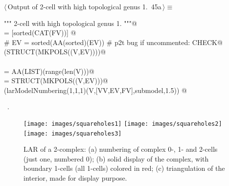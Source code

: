 \documentclass[11pt,oneside]{article}    %
\begin{document}
\begin{flushleft} \small \label{scrap75}
\protect{}$\langle\,$Output of 2-cell with high topological genus 1.\nobreak\ {\footnotesize 45a}$\,\rangle\equiv$
\vspace{-1ex}
\begin{list}{}{} \item
\mbox{}\verb@""" 2-cell with high topological genus 1. """@\\
\mbox{}\verb@FV = [sorted(CAT(FV))] @\\
\mbox{}\verb@# EV = sorted(AA(sorted)(EV))  # p2t bug if uncommented: CHECK@\\
\mbox{}\verb@VIEW(STRUCT(MKPOLS((V,EV))))@\\
\mbox{}\verb@@\\
\mbox{}\verb@VV = AA(LIST)(range(len(V)))@\\
\mbox{}\verb@submodel = STRUCT(MKPOLS((V,EV)))@\\
\mbox{}\verb@VIEW(larModelNumbering(1,1,1)(V,[VV,EV,FV],submodel,1.5)) @\\
\mbox{}\verb@@{\NWsep}
\end{list}
\vspace{-1ex}
\footnotesize\addtolength{\baselineskip}{-1ex}
\begin{list}{}{\setlength{\itemsep}{-\parsep}\setlength{\itemindent}{-\leftmargin}}
\item \NWtxtMacroRefIn\ .
\end{list}
\end{flushleft}


\begin{figure}[htbp] %
   \centering
   \texttt{[image: images/squareholes1]} 
   \texttt{[image: images/squareholes2]} 
   \texttt{[image: images/squareholes3]} 
   \caption{LAR of a 2-complex: (a) numbering of complex 0-, 1- and 2-cells (just one, numbered 0); (b) solid display of the complex, with boundary 1-cells (all 1-cells) colored in red; (c) triangulation of the interior, made for display purpose.}
   \label{fig:squareholes}
\end{figure}
\end{document}
